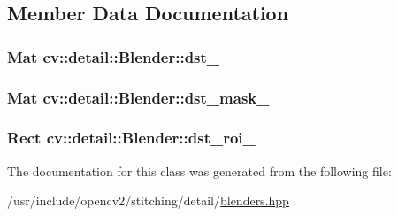 \subsection{Member Data Documentation}
\hypertarget{classcv_1_1detail_1_1Blender_abc7f2731625ea5d890847a905648667d}{
\subsubsection[{dst\-\_\-}]{\setlength{\rightskip}{0pt plus 5cm}Mat cv\-::detail\-::\-Blender\-::dst\-\_\-\hspace{0.3cm}{\ttfamily [protected]}}}\label{classcv_1_1detail_1_1Blender_abc7f2731625ea5d890847a905648667d}
\hypertarget{classcv_1_1detail_1_1Blender_a6dae09b144daeb3e81b6571b253ae08a}{
\subsubsection[{dst\-\_\-mask\-\_\-}]{\setlength{\rightskip}{0pt plus 5cm}Mat cv\-::detail\-::\-Blender\-::dst\-\_\-mask\-\_\-\hspace{0.3cm}{\ttfamily [protected]}}}\label{classcv_1_1detail_1_1Blender_a6dae09b144daeb3e81b6571b253ae08a}
\hypertarget{classcv_1_1detail_1_1Blender_a2d4bafbbb6dd7e87882bf88128bdd92f}{
\subsubsection[{dst\-\_\-roi\-\_\-}]{\setlength{\rightskip}{0pt plus 5cm}Rect cv\-::detail\-::\-Blender\-::dst\-\_\-roi\-\_\-\hspace{0.3cm}{\ttfamily [protected]}}}\label{classcv_1_1detail_1_1Blender_a2d4bafbbb6dd7e87882bf88128bdd92f}


The documentation for this class was generated from the following file\-:\begin{DoxyCompactItemize}
\item 
/usr/include/opencv2/stitching/detail/\hyperlink{blenders_8hpp}{blenders.\-hpp}\end{DoxyCompactItemize}
